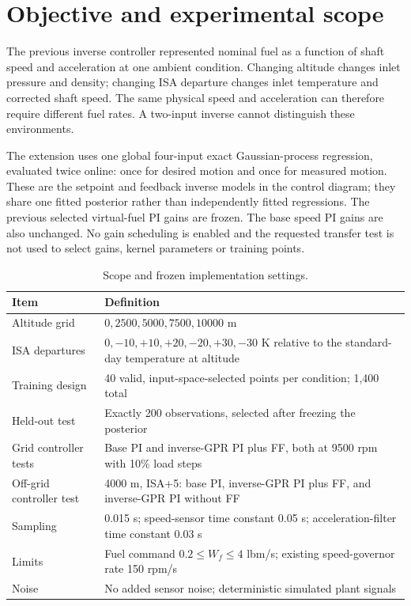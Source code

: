 \documentclass[11pt,a4paper]{article}
\begin{document}
\section{Objective and experimental scope}
The previous inverse controller represented nominal fuel as a function of shaft speed and acceleration at one ambient condition. Changing altitude changes inlet pressure and density; changing ISA departure changes inlet temperature and corrected shaft speed. The same physical speed and acceleration can therefore require different fuel rates. A two-input inverse cannot distinguish these environments.

The extension uses one global four-input exact Gaussian-process regression, evaluated twice online: once for desired motion and once for measured motion. These are the setpoint and feedback inverse models in the control diagram; they share one fitted posterior rather than independently fitted regressions. The previous selected virtual-fuel PI gains are frozen. The base speed PI gains are also unchanged. No gain scheduling is enabled and the requested transfer test is not used to select gains, kernel parameters or training points.

\begin{table}[H]\centering\small
\begin{tabularx}{\linewidth}{@{}lX@{}}\toprule Item & Definition\\\midrule
Altitude grid & $0,2500,5000,7500,10000$ m\\
ISA departures & $0,-10,+10,+20,-20,+30,-30$ K relative to the standard-day temperature at altitude\\
Training design & 40 valid, input-space-selected points per condition; 1,400 total\\
Held-out test & Exactly 200 observations, selected after freezing the posterior\\
Grid controller tests & Base PI and inverse-GPR PI plus FF, both at 9500 rpm with 10\% load steps\\
Off-grid controller test & 4000 m, ISA+5: base PI, inverse-GPR PI plus FF, and inverse-GPR PI without FF\\
Sampling & 0.015 s; speed-sensor time constant 0.05 s; acceleration-filter time constant 0.03 s\\
Limits & Fuel command $0.2\leq W_f\leq4$ lbm/s; existing speed-governor rate 150 rpm/s\\
Noise & No added sensor noise; deterministic simulated plant signals\\\bottomrule
\end{tabularx}\caption{Scope and frozen implementation settings.}\end{table}
\end{document}

